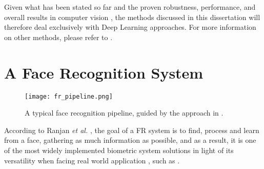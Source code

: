 \documentclass[class=report, crop=false, a4paper, 12pt]{standalone}
\begin{document}
\par Given what has been stated so far and the proven robustness, performance, and overall results in computer vision , the methods discussed in this dissertation will therefore deal exclusively with Deep Learning approaches. For more information on other methods, please refer to \autocite{learned-millerLabeledFacesWild2016}.




\section{A Face Recognition System}

\begin{figure}[!h]
    \texttt{[image: fr\_pipeline.png]}
    \caption[Pipeline]{A typical face recognition pipeline, guided by the approach in \autocite{wangDeepFaceRecognition2021}.}
    \label{fig:fr pipeline}
\end{figure}

\par According to Ranjan \textit{et al.} \autocite{ranjanDeepLearningUnderstanding2018}, the goal of a FR system is to find, process and learn from a face, gathering as much information as possible, and as a result, it is one of the most widely implemented biometric system solutions in light of its versatility when facing real world application \autocite{duElementsEndtoendDeep2022}, such as .
\end{document}
